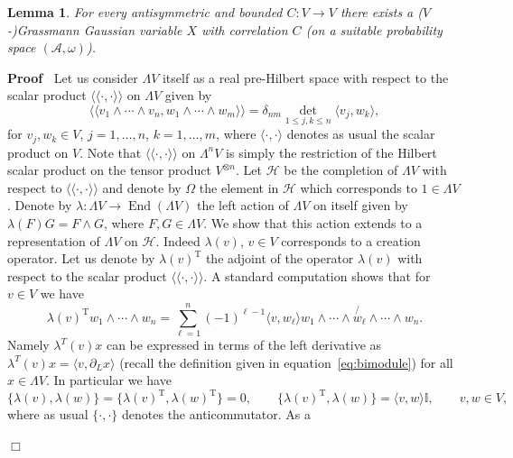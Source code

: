 \documentclass{article}
\newcommand{\Tau}{\mathrm{T}}
\newcommand{\llangle}{{\langle\!\langle}}
\newcommand{\rrangle}{{\rangle\!\rangle}}
\newcommand{\tmop}[1]{\ensuremath{\operatorname{#1}}}
\newenvironment{proof}{\noindent\textbf{Proof\ }}{\hspace*{\fill}$\Box$\medskip}
\newtheorem{lemma}[theorem]{Lemma}
\begin{document}
\begin{lemma}
  For every antisymmetric and bounded $C : V \rightarrow V$ there exists a
  ($V$-)Grassmann Gaussian variable $X$ with correlation $C$ (on a suitable
  probability space $(\mathcal{A}, \omega)$).
\end{lemma}

\begin{proof}
  Let us consider $\Lambda V$ itself as a real pre-Hilbert space with respect
  to the scalar product $\llangle \cdot, \cdot \rrangle$ on $\Lambda V$ given
  by
  \[ \llangle v_1 \wedge \cdots \wedge v_n, w_1 \wedge \cdots \wedge w_m
     \rrangle = \delta_{n m} \underset{1 \leqslant j, k \leqslant n}{\det}
     \langle v_j, w_k \rangle, \]
  for $v_j, w_k \in V$, $j = 1, \ldots, n$, $k = 1, \ldots, m$, where $\langle
  \cdot, \cdot \rangle$ denotes as usual the scalar product on $V$. Note that
  $\llangle \cdot, \cdot \rrangle$ on $\Lambda^n V$ is simply the restriction
  of the Hilbert scalar product on the tensor product $V^{\otimes n}$. Let
  $\mathcal{H}$ be the completion of $\Lambda V$ with respect to $\llangle
  \cdot, \cdot \rrangle$ and denote by $\Omega$ the element in $\mathcal{H}$
  which corresponds to $1 \in \Lambda V$. Denote by $\lambda : \Lambda V
  \rightarrow \tmop{End} (\Lambda V)$ the left action of $\Lambda V$ on itself
  given by $\lambda (F) G = F \wedge G$, where $F, G \in \Lambda V$. We show
  that this action extends to a representation of $\Lambda V$ on
  $\mathcal{H}$. Indeed $\lambda (v)$, $v \in V$ corresponds to a creation
  operator. Let us denote by $\lambda (v)^{\Tau}$ the adjoint of the operator
  $\lambda (v)$ with respect to the scalar product $\llangle \cdot, \cdot
  \rrangle$. A standard computation shows that for $v \in V$ we have
  \[ \lambda (v)^{\Tau} w_1 \wedge \cdots \wedge w_n = \sum_{\ell = 1}^n (-
     1)^{\ell - 1} \langle v, w_{\ell} \rangle w_1 \wedge \cdots \wedge
     \not{w_{\ell}} \wedge \cdots \wedge w_n . \]
  Namely $\lambda^T (v) x$ can be expressed in terms of the left derivative as
  $\lambda^T (v) x = \langle v, \partial_L x \rangle$ (recall the definition
  given in equation~{\eqref{eq:bimodule}}) for all $x \in \Lambda V$. In
  particular we have
  \begin{equation}
    \{ \lambda (v), \lambda (w) \} = \{ \lambda (v)^{\Tau}, \lambda (w)^{\Tau}
    \} = 0, \qquad \{ \lambda (v)^{\Tau}, \lambda (w) \} = \langle v, w
    \rangle \mathbb{I}, \qquad v, w \in V, \label{eq:car}
  \end{equation}
  where as usual $\{ \cdot, \cdot \}$ denotes the anticommutator. As a

\end{proof}
\end{document}
